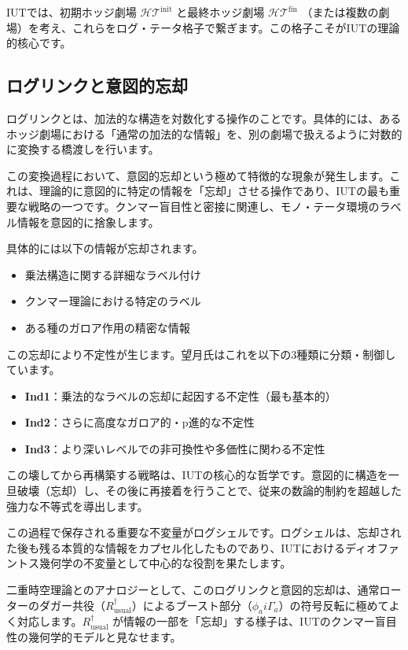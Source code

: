 \documentclass[a4paper,12pt,notitlepage]{jsreport}
\begin{document}
IUTでは、初期ホッジ劇場 $\mathcal{HT}^{\mathrm{init}}$ と最終ホッジ劇場 $\mathcal{HT}^{\mathrm{fin}}$ （または複数の劇場）を考え、これらをログ・テータ格子で繋ぎます。この格子こそがIUTの理論的核心です。

\subsection{ログリンクと意図的忘却}

ログリンクとは、加法的な構造を対数化する操作のことです。具体的には、あるホッジ劇場における「通常の加法的な情報」を、別の劇場で扱えるように対数的に変換する橋渡しを行います。

この変換過程において、意図的忘却という極めて特徴的な現象が発生します。これは、理論的に意図的に特定の情報を「忘却」させる操作であり、IUTの最も重要な戦略の一つです。クンマー盲目性と密接に関連し、モノ・テータ環境のラベル情報を意図的に捨象します。

具体的には以下の情報が忘却されます。
\begin{itemize}
  \item 乗法構造に関する詳細なラベル付け
  \item クンマー理論における特定のラベル
  \item ある種のガロア作用の精密な情報
\end{itemize}

この忘却により不定性が生じます。望月氏はこれを以下の3種類に分類・制御しています。
\begin{itemize}
  \item \textbf{Ind1}：乗法的なラベルの忘却に起因する不定性（最も基本的）
  \item \textbf{Ind2}：さらに高度なガロア的・p進的な不定性
  \item \textbf{Ind3}：より深いレベルでの非可換性や多価性に関わる不定性
\end{itemize}

この壊してから再構築する戦略は、IUTの核心的な哲学です。意図的に構造を一旦破壊（忘却）し、その後に再接着を行うことで、従来の数論的制約を超越した強力な不等式を導出します。

この過程で保存される重要な不変量がログシェルです。ログシェルは、忘却された後も残る本質的な情報をカプセル化したものであり、IUTにおけるディオファントス幾何学の不変量として中心的な役割を果たします。

二重時空理論とのアナロジーとして、このログリンクと意図的忘却は、通常ローターのダガー共役（$R_{\text{usual}}^\dagger$）によるブースト部分（$\phi_a i \Gamma_a$）の符号反転に極めてよく対応します。$R_{\text{usual}}^\dagger$ が情報の一部を「忘却」する様子は、IUTのクンマー盲目性の幾何学的モデルと見なせます。
\end{document}
